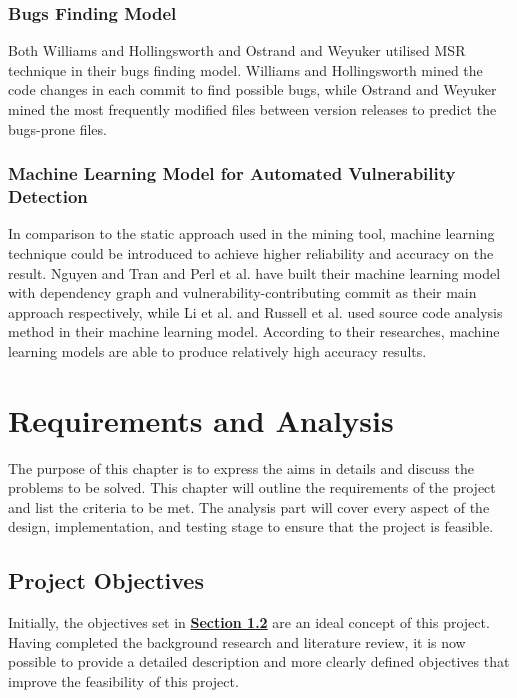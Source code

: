 \documentclass[12pt, a4paper]{report}
\begin{document}
\subsection{Bugs Finding Model}
Both Williams and Hollingsworth \cite{williams_2005} and Ostrand and Weyuker \cite{ostrand_2004}
utilised MSR technique in their bugs finding model. Williams and Hollingsworth mined the code
changes in each commit to find possible bugs, while Ostrand and Weyuker mined the most frequently
modified files between version releases to predict the bugs-prone files.

\subsection{Machine Learning Model for Automated Vulnerability Detection}
In comparison to the static approach used in the mining tool, machine learning technique could be
introduced to achieve higher reliability and accuracy on the result. Nguyen and Tran
\cite{nguyen_2010} and Perl et al. \cite{perl_2015} have built their machine learning model with
dependency graph and vulnerability-contributing commit as their main approach respectively, while Li
et al. \cite{li_2016} and Russell et al. \cite{russell_2018} used source code analysis method in
their machine learning model. According to their researches, machine learning models are able to
produce relatively high accuracy results.

\chapter{Requirements and Analysis}
The purpose of this chapter is to express the aims in details and discuss the problems to be solved.
This chapter will outline the requirements of the project and list the criteria to be met. The
analysis part will cover every aspect of the design, implementation, and testing stage to ensure
that the project is feasible.

\section{Project Objectives}
Initially, the objectives set in \hyperref[sec:objectives]{\textbf{Section 1.2}} are an ideal
concept of this project. Having completed the background research and literature review, it is now
possible to provide a detailed description and more clearly defined objectives that improve the
feasibility of this project.
\end{document}
